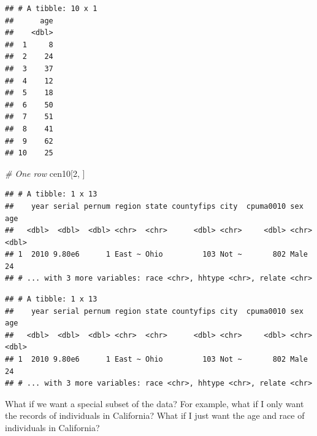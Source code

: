 \documentclass[]{book}
\newenvironment{Shaded}{\begin{snugshade}}{\end{snugshade}}
\newcommand{\CommentTok}[1]{\textcolor[rgb]{0.56,0.35,0.01}{\textit{#1}}}
\newcommand{\DecValTok}[1]{\textcolor[rgb]{0.00,0.00,0.81}{#1}}
\newcommand{\KeywordTok}[1]{\textcolor[rgb]{0.13,0.29,0.53}{\textbf{#1}}}
\newcommand{\NormalTok}[1]{#1}
\newcommand{\OperatorTok}[1]{\textcolor[rgb]{0.81,0.36,0.00}{\textbf{#1}}}
\newcommand{\StringTok}[1]{\textcolor[rgb]{0.31,0.60,0.02}{#1}}
\theoremstyle{definition}
\theoremstyle{definition}
\theoremstyle{definition}
\theoremstyle{remark}
\begin{document}
\begin{verbatim}
## # A tibble: 10 x 1
##      age
##    <dbl>
##  1     8
##  2    24
##  3    37
##  4    12
##  5    18
##  6    50
##  7    51
##  8    41
##  9    62
## 10    25
\end{verbatim}

\begin{Shaded}
\begin{Highlighting}[]
\CommentTok{# One row}
\NormalTok{cen10[}\DecValTok{2}\NormalTok{, ]}
\end{Highlighting}
\end{Shaded}

\begin{verbatim}
## # A tibble: 1 x 13
##    year serial pernum region state countyfips city  cpuma0010 sex     age
##   <dbl>  <dbl>  <dbl> <chr>  <chr>      <dbl> <chr>     <dbl> <chr> <dbl>
## 1  2010 9.80e6      1 East ~ Ohio         103 Not ~       802 Male     24
## # ... with 3 more variables: race <chr>, hhtype <chr>, relate <chr>
\end{verbatim}

\begin{Shaded}
\end{Shaded}

\begin{verbatim}
## # A tibble: 1 x 13
##    year serial pernum region state countyfips city  cpuma0010 sex     age
##   <dbl>  <dbl>  <dbl> <chr>  <chr>      <dbl> <chr>     <dbl> <chr> <dbl>
## 1  2010 9.80e6      1 East ~ Ohio         103 Not ~       802 Male     24
## # ... with 3 more variables: race <chr>, hhtype <chr>, relate <chr>
\end{verbatim}

What if we want a special subset of the data? For example, what if I only want the records of individuals in California? What if I just want the age and race of individuals in California?

\begin{Shaded}
\end{Shaded}
\end{document}

